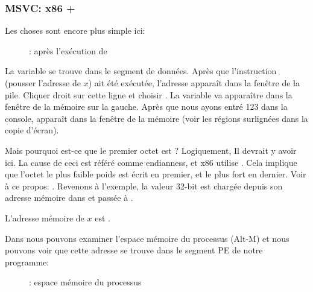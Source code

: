 \clearpage
\subsubsection{MSVC: x86 + \olly}
\myindex{\olly}

Les choses sont encore plus simple ici:

\begin{figure}[H]
\centering
{}
\caption{\olly: après l'exécution de \scanf}
\label{fig:scanf_ex2_olly_1}
\end{figure}

La variable se trouve dans le segment de données.
Après que l'instruction \PUSH (pousser l'adresse de $x$) ait été exécutée,
l'adresse apparaît dans la fenêtre de la pile. Cliquer droit sur cette ligne
et choisir . %
La variable va apparaître dans la fenêtre de la mémoire sur la gauche.
Après que nous ayons entré 123 dans la console,  apparaît dans la fenêtre
de la mémoire (voir les régions surlignées dans la copie d'écran).

Mais pourquoi est-ce que le premier octet est ?
Logiquement, Il devrait y avoir  ici.
La cause de ceci est référé comme \gls{endianness}, et x86 utilise .
Cela implique que l'octet le plus faible poids est écrit en premier, et le plus fort
en dernier.
Voir à ce propos: .
Revenons à l'exemple, la valeur 32-bit est chargée depuis son adresse mémoire
dans \EAX et passée à \printf.

L'adresse mémoire de $x$ est .

\clearpage
Dans \olly nous pouvons examiner l'espace mémoire du processus  (Alt-M) et nous
pouvons voir que cette adresse se trouve dans le segment PE  de notre
programme:

\label{olly_memory_map_example}
\begin{figure}[H]
\centering
{}
\caption{\olly: espace mémoire du processus}
\label{fig:scanf_ex2_olly_2}
\end{figure}

